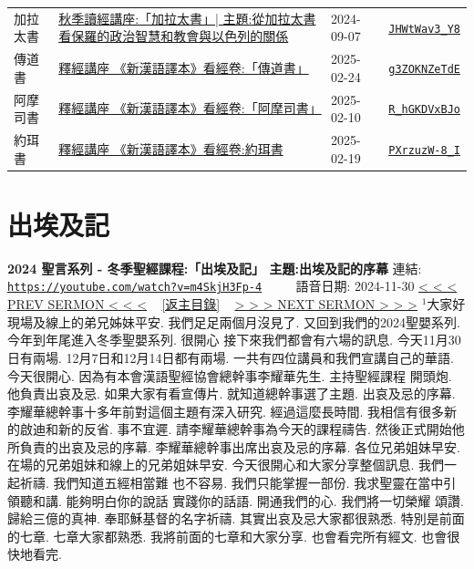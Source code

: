 \documentclass{book}
\begin{document}
{\begin{xltabular}{\textwidth}{|p{0.15\textwidth} p{0.6\textwidth}|p{0.07\textwidth} p{0.1\textwidth}|}
加拉太書   & \hyperref[sec:JHWtWav3_Y8]{秋季讀經講座:「加拉太書」| 主題:從加拉太書看保羅的政治智慧和教會與以色列的關係} & 2024-09-07 & \href{https://youtube.com/watch?v=JHWtWav3_Y8}{\texttt{JHWtWav3\_Y8}} \\
傳道書   & \hyperref[sec:g3ZOKNZeTdE]{釋經講座 《新漢語譯本》看經卷:「傳道書」} & 2025-02-24 & \href{https://youtube.com/watch?v=g3ZOKNZeTdE}{\texttt{g3ZOKNZeTdE}} \\
阿摩司書   & \hyperref[sec:R_hGKDVxBJo]{釋經講座 《新漢語譯本》看經卷:「阿摩司書」} & 2025-02-10 & \href{https://youtube.com/watch?v=R_hGKDVxBJo}{\texttt{R\_hGKDVxBJo}} \\
約珥書   & \hyperref[sec:PXrzuzW_8_I]{釋經講座 《新漢語譯本》看經卷:約珥書} & 2025-02-19 & \href{https://youtube.com/watch?v=PXrzuzW-8_I}{\texttt{PXrzuzW-8\_I}} \\
\end{xltabular}
}
\newpage



\section{出埃及記}
\label{sec:m4SkjH3Fp_4}
\textbf{2024 聖言系列 - 冬季聖經課程:「出埃及記」 主題:出埃及記的序幕}
\newline
\newline
連結: \href{https://youtube.com/watch?v=m4SkjH3Fp-4}{\texttt{https://youtube.com/watch?v=m4SkjH3Fp-4}} ~~~~ 語音日期: 2024-11-30
\newline
\newline
\hyperref[sec:code]{\small{< < < PREV SERMON < < <}}
~
\hyperref[sec:index]{\small{[返主目錄]}}
~
\hyperref[sec:dqXyjOETQK4]{\small{> > > NEXT SERMON > > >}}
\newline
\newline
$^{1}$大家好 現場及線上的弟兄姊妹平安.
我們足足兩個月沒見了.
又回到我們的2024聖嬰系列.
今年到年尾進入冬季聖嬰系列.
很開心 接下來我們都會有六場的訊息.
今天11月30日有兩場.
12月7日和12月14日都有兩場.
一共有四位講員和我們宣講自己的華語.
今天很開心.
因為有本會漢語聖經協會總幹事李耀華先生.
主持聖經課程 開頭炮.
他負責出哀及忌.
如果大家有看宣傳片.
就知道總幹事選了主題.
出哀及忌的序幕.
李耀華總幹事十多年前對這個主題有深入研究.
經過這麼長時間.
我相信有很多新的啟迪和新的反省.
事不宜遲.
請李耀華總幹事為今天的課程禱告.
然後正式開始他所負責的出哀及忌的序幕.
李耀華總幹事出席出哀及忌的序幕.
各位兄弟姐妹早安.
在場的兄弟姐妹和線上的兄弟姐妹早安.
今天很開心和大家分享整個訊息.
我們一起祈禱.
我們知道五經相當難 也不容易.
我們只能掌握一部份.
我求聖靈在當中引領聽和講.
能夠明白你的說話 實踐你的話語.
開通我們的心.
我們將一切榮耀 頌讚.
歸給三億的真神.
奉耶穌基督的名字祈禱.
其實出哀及忌大家都很熟悉.
特別是前面的七章.
七章大家都熟悉.
我將前面的七章和大家分享.
也會看完所有經文.
也會很快地看完.
\end{document}
